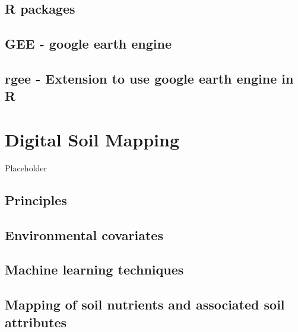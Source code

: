\documentclass[
  10pt,
  b5paper,
  oneside]{book}
\begin{document}
\hypertarget{r-packages}{%
\section{R packages}\label{r-packages}}

\hypertarget{gee---google-earth-engine}{%
\section{GEE - google earth engine}\label{gee---google-earth-engine}}

\hypertarget{rgee---extension-to-use-google-earth-engine-in-r}{%
\section{rgee - Extension to use google earth engine in R}\label{rgee---extension-to-use-google-earth-engine-in-r}}

\hypertarget{digital-soil-mapping}{%
\chapter{Digital Soil Mapping}\label{digital-soil-mapping}}

Placeholder

\hypertarget{principles}{%
\section{Principles}\label{principles}}

\hypertarget{environmental-covariates}{%
\section{Environmental covariates}\label{environmental-covariates}}

\hypertarget{machine-learning-techniques}{%
\section{Machine learning techniques}\label{machine-learning-techniques}}

\hypertarget{mapping-of-soil-nutrients-and-associated-soil-attributes}{%
\section{Mapping of soil nutrients and associated soil attributes}\label{mapping-of-soil-nutrients-and-associated-soil-attributes}}
\end{document}
